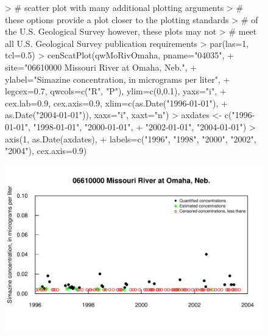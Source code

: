 \documentclass[11pt]{article}
\begin{document}
\begin{figure}[H]
\centering
\begin{Schunk}
\begin{Sinput}
> # scatter plot with many additional plotting arguments
> # these options provide a plot closer to the plotting standards
> #  of the U.S. Geological Survey however, these plots may not 
> # meet all U.S. Geological Survey publication requirements
> par(las=1, tcl=0.5)
> cenScatPlot(qwMoRivOmaha, pname="04035", 
+                        site="06610000 Missouri River at Omaha, Neb.",
+                        ylabel="Simazine concentration, in micrograms per liter",
+                        legcex=0.7, qwcols=c("R", "P"), ylim=c(0,0.1), yaxs="i", 
+                        cex.lab=0.9, cex.axis=0.9, xlim=c(as.Date("1996-01-01"), 
+                        as.Date("2004-01-01")), xaxs="i", xaxt="n")
> axdates <- c("1996-01-01", "1998-01-01", "2000-01-01", 
+                        "2002-01-01", "2004-01-01")
> axis(1, as.Date(axdates), 
+                        labels=c("1996", "1998", "2000", "2002", "2004"), cex.axis=0.9)
\end{Sinput}
\end{Schunk}
\includegraphics{vignette-003}
\end{figure}
\end{document}
